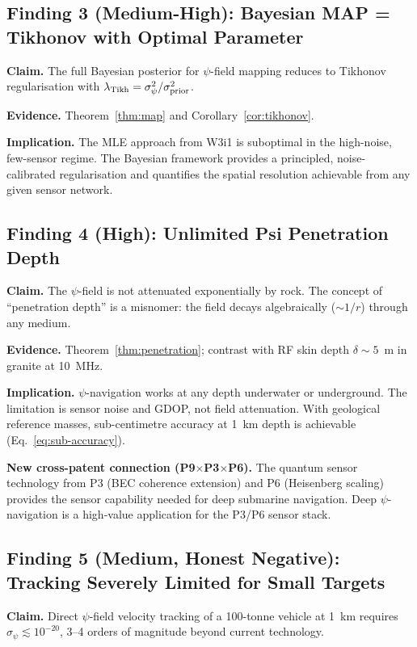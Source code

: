 \documentclass[aps,prd,twocolumn,superscriptaddress,nofootinbib]{revtex4-2}
\begin{document}
\subsection*{Finding 3 (Medium-High): Bayesian MAP = Tikhonov with Optimal Parameter}

\textbf{Claim.} The full Bayesian posterior for $\psi$-field mapping
reduces to Tikhonov regularisation with $\lambda_{\rm Tikh} = \sigma_\psi^2/\sigma_{\rm prior}^2$.

\textbf{Evidence.} Theorem~\ref{thm:map} and Corollary~\ref{cor:tikhonov}.

\textbf{Implication.} The MLE approach from W3i1 is suboptimal in the
high-noise, few-sensor regime.  The Bayesian framework provides a
principled, noise-calibrated regularisation and quantifies the spatial
resolution achievable from any given sensor network.

\subsection*{Finding 4 (High): Unlimited Psi Penetration Depth}

\textbf{Claim.} The $\psi$-field is not attenuated exponentially by rock.
The concept of ``penetration depth'' is a misnomer: the field decays
algebraically ($\sim 1/r$) through any medium.

\textbf{Evidence.} Theorem~\ref{thm:penetration}; contrast with RF
skin depth $\delta \sim 5$~m in granite at 10~MHz.

\textbf{Implication.} $\psi$-navigation works at any depth underwater
or underground.  The limitation is sensor noise and GDOP, not
field attenuation.  With geological reference masses, sub-centimetre
accuracy at 1~km depth is achievable (Eq.~\eqref{eq:sub-accuracy}).

\textbf{New cross-patent connection (P9$\times$P3$\times$P6).} The
quantum sensor technology from P3 (BEC coherence extension) and P6
(Heisenberg scaling) provides the sensor capability needed for deep
submarine navigation.  Deep $\psi$-navigation is a high-value
application for the P3/P6 sensor stack.

\subsection*{Finding 5 (Medium, Honest Negative): Tracking Severely Limited for Small Targets}

\textbf{Claim.} Direct $\psi$-field velocity tracking of a 100-tonne
vehicle at 1~km requires $\sigma_\psi \lesssim 10^{-20}$, 3--4 orders
of magnitude beyond current technology.
\end{document}

